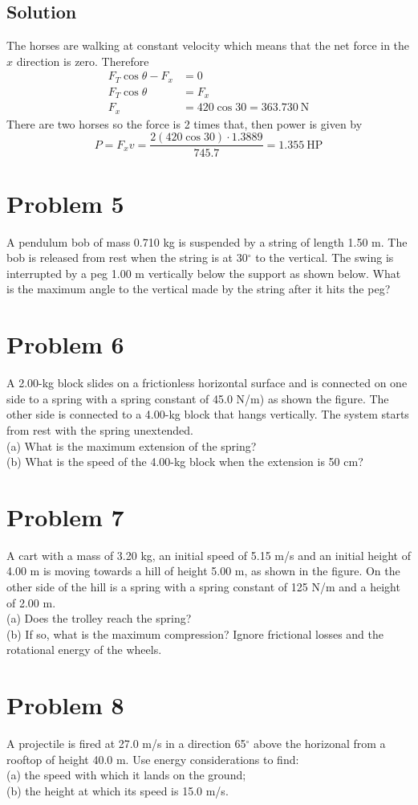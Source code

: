 \documentclass{article}
\begin{document}
\subsection*{Solution}
The horses are walking at constant velocity which means that the net force in the $x$ direction is zero. Therefore
\begin{align*}
	F_T \cos \theta - F_x &= 0 \\
	F_T \cos \theta &= F_x \\
	F_x &= 420 \cos 30 = 363.730\ \text{N}
\end{align*}
There are two horses so the force is 2 times that, then power is given by
\[
	P = F_x v = \frac{2 \left(420 \cos 30 \right) \cdot 1.3889}{745.7} = \boxed{1.355\ \text{HP}}
\]

\section*{Problem 5}
A pendulum bob of mass 0.710 kg is suspended by a string of length 1.50 m. The bob is released from rest
when the string is at 30$^\circ$ to the vertical. The swing is interrupted by a peg 1.00 m vertically below the support
as shown below. What is the maximum angle to the vertical made by the string after it hits the peg?

\section*{Problem 6}
A 2.00-kg block slides on a frictionless horizontal surface and is connected on one side to a spring with a
spring constant of 45.0 N/m) as shown the figure. The other side is connected to a 4.00-kg block that hangs
vertically. The system starts from rest with the spring unextended. \\
(a) What is the maximum extension of the spring? \\
(b) What is the speed of the 4.00-kg block when the extension is 50 cm?

\section*{Problem 7}
A cart with a mass of 3.20 kg, an initial speed of 5.15 m/s and an initial height of 4.00 m is moving
towards a hill of height 5.00 m, as shown in the figure. On the other side of the hill is a spring with a spring
constant of 125 N/m and a height of 2.00 m. \\
(a) Does the trolley reach the spring? \\
(b) If so, what is the maximum compression? Ignore frictional losses and the rotational energy of the wheels.

\section*{Problem 8}
A projectile is fired at 27.0 m/s in a direction 65$^\circ$ above the horizonal from a rooftop of height 40.0 m. Use
energy considerations to find: \\
(a) the speed with which it lands on the ground; \\
(b) the height at which its speed is 15.0 m/s.
\end{document}
